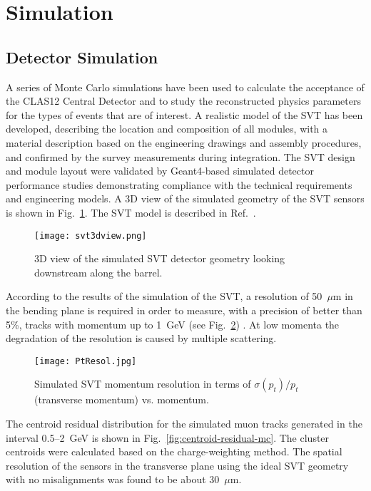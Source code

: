 \section{Simulation}

\subsection{Detector Simulation}

A series of Monte Carlo simulations have been used to calculate the acceptance of the CLAS12 Central Detector
and to study the reconstructed physics parameters for the types of events that are of interest. A realistic model
of the SVT has been developed, describing the location and composition of all modules, with a material description
based on the engineering drawings and assembly procedures, and confirmed by the survey measurements during
integration. The SVT design and module layout were validated by Geant4-based simulated detector performance
studies demonstrating compliance with the technical requirements and engineering models. A 3D view of the
simulated geometry of the SVT sensors is shown in Fig.~\ref{fig:svt3dview}. The SVT model is described in
Ref.~\cite{sim-nim}. 

\begin{figure}[hbt] 
\centering 
\texttt{[image: svt3dview.png]}
\caption{3D view of the simulated SVT detector geometry looking downstream along the barrel.}
\label{fig:svt3dview}
\end{figure}

According to the results of the simulation of the SVT, a resolution of 50~$\mu$m in the bending plane is required
in order to measure, with a precision of better than 5\%, tracks with momentum up to 1~GeV (see
Fig.~\ref{fig:PtRes}) \cite{MC1,MC2}. At low momenta the degradation of the resolution is caused by multiple
scattering.

\begin{figure}[hbt]
\texttt{[image: PtResol.jpg]}
\caption{Simulated SVT momentum resolution in terms of $\sigma(p_t)/p_t$ (transverse momentum) vs.
  momentum.}
\label{fig:PtRes}
\end{figure}

The centroid residual distribution for the simulated muon tracks generated in the interval 0.5--2~GeV is shown in
Fig.~\ref{fig:centroid-residual-mc}. The cluster centroids were calculated based on the charge-weighting method.
The spatial resolution of the sensors in the transverse plane using the ideal SVT geometry with no misalignments
was found to be about 30~$\mu$m. 

